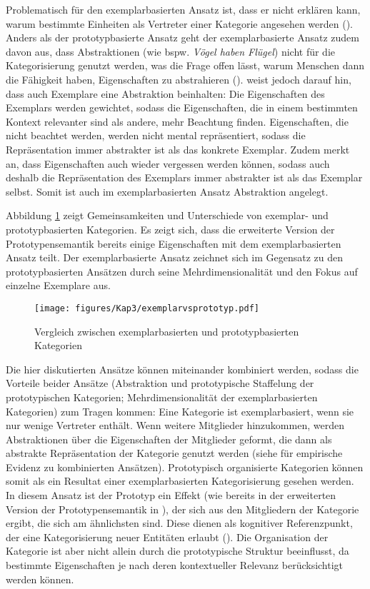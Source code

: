   
Problematisch für den exemplarbasierten Ansatz ist, dass er nicht erklären kann, warum bestimmte Einheiten als Vertreter einer Kategorie angesehen werden (\cite[47]{Goldberg.2006}). Anders als der prototypbasierte Ansatz geht der exemplarbasierte Ansatz zudem davon aus, dass Abstraktionen (wie bspw. \textit{Vögel haben Flügel}) nicht für die Kategorisierung genutzt werden, was die Frage offen lässt, warum Menschen dann die Fähigkeit haben, Eigenschaften zu abstrahieren (\cite[215]{Ross.1999}). \textcite[46]{Goldberg.2006} weist jedoch darauf hin, dass auch Exemplare eine Abstraktion beinhalten: Die Eigenschaften des Exemplars werden gewichtet, sodass die Eigenschaften, die in einem bestimmten Kontext relevanter sind als andere, mehr Beachtung finden. Eigenschaften, die nicht beachtet werden, werden nicht mental repräsentiert, sodass die Repräsentation immer abstrakter ist als das konkrete Exemplar. Zudem merkt \textcite[46]{Goldberg.2006} an, dass Eigenschaften auch wieder vergessen werden können, sodass auch deshalb die Repräsentation des Exemplars immer abstrakter ist als das Exemplar selbst. Somit ist auch im exemplarbasierten Ansatz Abstraktion angelegt.

Abbildung \ref{Vergleichexempl} zeigt Gemeinsamkeiten und Unterschiede von exemplar- und prototypbasierten Kategorien. Es zeigt sich, dass die erweiterte Version der Prototypensemantik bereits einige Eigenschaften mit dem exemplarbasierten Ansatz teilt. Der exemplarbasierte Ansatz zeichnet sich im Gegensatz zu den prototypbasierten Ansätzen durch seine Mehrdimensionalität und den Fokus auf einzelne Exemplare aus.

\begin{figure}
\texttt{[image: figures/Kap3/exemplarvsprototyp.pdf]}  
\caption{Vergleich zwischen exemplarbasierten und prototypbasierten Kategorien}
\label{Vergleichexempl}
\end{figure}

Die hier diskutierten Ansätze können miteinander kombiniert werden, sodass die Vorteile beider Ansätze (Abstraktion und prototypische Staffelung der prototypischen Kategorien; Mehrdimensionalität der exemplarbasierten Kategorien) zum Tragen kommen: Eine Kategorie ist exemplarbasiert, wenn sie nur wenige Vertreter enthält. Wenn weitere Mitglieder hinzukommen, werden Abstraktionen über die Eigenschaften der Mitglieder geformt, die dann als abstrakte Repräsentation der Kategorie genutzt werden (siehe \cite[216--222]{Ross.1999} für empirische Evidenz zu kombinierten Ansätzen). Prototypisch organisierte Kategorien können somit als ein Resultat einer exemplarbasierten Kategorisierung gesehen werden. In diesem Ansatz ist der Prototyp ein Effekt (wie bereits in der erweiterten Version der Prototypensemantik in ), der sich aus den Mitgliedern der Kategorie ergibt, die sich am ähnlichsten sind. Diese dienen als kognitiver Referenzpunkt, der eine Kategorisierung neuer Entitäten erlaubt (\cite[13]{Diessel.2017}). Die Organisation der Kategorie ist aber nicht allein durch die prototypische Struktur beeinflusst, da bestimmte Eigenschaften je nach deren kontextueller Relevanz berücksichtigt werden können. 

